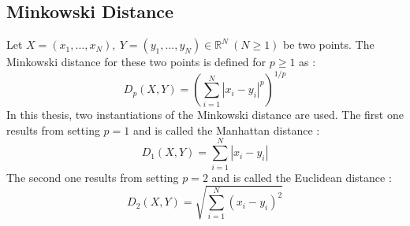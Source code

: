 \subsection{Minkowski Distance}
Let $X = (x_1, ..., x_N), \ Y = (y_1, ..., y_N) \in \mathbb{R}^N \ (N \geq 1)$ be two points. The Minkowski distance for these two points is defined for $p \geq 1$ as \cite{Minkowski_Distance}:
\begin{equation}
D_p(X,Y) = \left(\sum_{i=1}^{N} |x_i - y_i|^p\right)^{1/p}
\label{eq:minkowski_distance}
\end{equation}
In this thesis, two instantiations of the Minkowski distance are used. The first one results from setting $p = 1$ and is called the Manhattan distance \cite{Minkowski_Distance}:
\begin{equation}
D_1(X,Y) = \sum_{i=1}^{N} |x_i - y_i|
\label{eq:manhattan_distance}
\end{equation}
The second one results from setting $p = 2$ and is called the Euclidean distance \cite{Minkowski_Distance}:
\begin{equation}
D_2(X,Y) = \sqrt{\sum_{i=1}^{N} (x_i - y_i)^2}
\label{eq:manhattan_distance}
\end{equation}